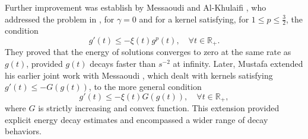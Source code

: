 Further improvement was establish by Messaoudi and Al-Khulaifi \cite{MessaoudiWaled}, who addressed the problem in \cite{CavalcantiDS}, for $\gamma =0$ and for a kernel satisfying, for $1\leq p\leq \frac{3}{2}$, the condition
\[
g'(t) \leq -\xi(t) g^p(t), \quad \forall t \in \mathbb{R}_{+}.
\]
They proved that the energy of solutions converges to zero at the same rate as $g(t)$, provided $g(t)$ decays faster than $s^{-2}$ at infinity. Later, Mustafa \cite{MM181} extended his earlier joint work with Messaoudi \cite{MM}, which dealt with kernels satisfying $g'(t) \leq -G(g(t))$, to the more general condition $$g'(t) \leq -\xi(t) G(g(t)), \quad \forall t \in \mathbb{R}_{+},$$ where $G$ is strictly increasing and convex function. This extension provided explicit energy decay estimates and encompassed a wider range of decay behaviors.

